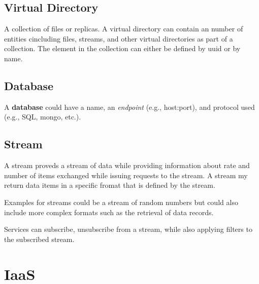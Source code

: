 \documentclass[9pt,twocolumn]{styles/osajnl}
\begin{document}



\subsection{Virtual Directory}

A collection of files or replicas. A virtual directory can contain an
number of entities cincluding files, streams, and other virtual
directories as part of a collection. The element in the collection can
either be defined by uuid or by name. 


\subsection{Database}

A \textbf{database} could have a name, an \textit{endpoint} (e.g., host:port),
and protocol used (e.g., SQL, mongo, etc.).


\subsection{Stream} 

A stream proveds a stream of data while providing information about
rate and number of items exchanged while issuing requests to the
stream. A stream my return data items in a specific fromat that is
defined by the stream. 


Examples for streams could be a stream of random numbers but could
also include more complex formats such as the retrieval of data
records. 

Services can subscribe, unsubscribe from a stream, while also applying
filters to the subscribed stream.



\section{IaaS}
\end{document}
